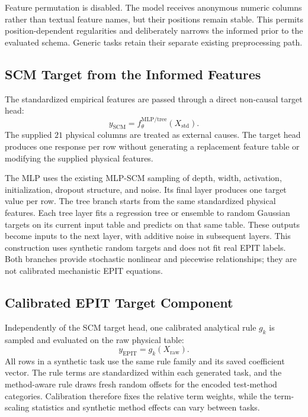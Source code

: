 \documentclass{article}
\begin{document}
Feature permutation is disabled. The model receives anonymous numeric columns
rather than textual feature names, but their positions remain stable. This
permits position-dependent regularities and deliberately narrows the informed
prior to the evaluated schema. Generic tasks retain their separate existing
preprocessing path.

\subsection{SCM Target from the Informed Features}

The standardized empirical features are passed through a direct non-causal
target head:
\begin{equation}
y_{\mathrm{SCM}}=f_{\theta}^{\mathrm{MLP/tree}}(X_{\mathrm{std}}).
\label{eq:scm-target}
\end{equation}
The supplied \(21\) physical columns are treated as external causes. The
target head produces one response per row without generating a replacement
feature table or modifying the supplied physical features.

The MLP uses the existing MLP-SCM sampling of depth, width, activation,
initialization, dropout structure, and noise. Its final layer produces one
target value per row. The tree branch starts from the same standardized
physical features. Each tree layer fits a regression tree or ensemble to
random Gaussian targets on its current input table and predicts on that
same table. These outputs become inputs to the next layer, with additive
noise in subsequent layers. This construction uses synthetic random targets
and does not fit real EPIT labels. Both branches provide stochastic nonlinear
and piecewise relationships; they are not calibrated mechanistic EPIT
equations.

\subsection{Calibrated EPIT Target Component}

Independently of the SCM target head, one calibrated analytical rule \(g_k\)
is sampled and evaluated on the raw physical table:
\begin{equation}
y_{\mathrm{EPIT}}=g_k(X_{\mathrm{raw}}).
\label{eq:epit-target}
\end{equation}
All rows in a synthetic task use the same rule family and its saved
coefficient vector. The rule terms are standardized within each generated
task, and the method-aware rule draws fresh random offsets for the encoded
test-method categories. Calibration therefore fixes the relative term
weights, while the term-scaling statistics and synthetic method effects can
vary between tasks.
\end{document}
